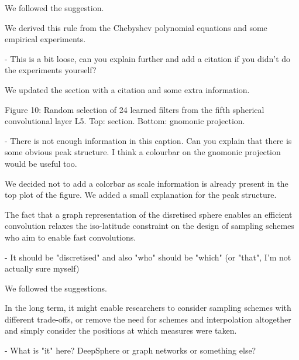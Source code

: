 \documentclass[12pt,a4paper]{article}
\newcommand{\nati}[1]{{\color[rgb]{.1,.6,.1}{NP: #1}}}
\newcommand{\TK}[1]{{\color{red}{TK: #1}}}
\newcommand{\todo}[1]{{\color[rgb]{.6,.1,.6}{TODO: #1}}}
\newcommand{\1}{\b{1}}              %
\newcommand{\0}{\b{0}}              %
\begin{document}
We followed the suggestion.

\begin{mdframed}[style=comment]
We derived this rule from the Chebyshev polynomial equations and some empirical experiments.

- This is a bit loose, can you explain further and add a citation if you didn't do the experiments yourself?
\end{mdframed}


We updated the section with a citation and some extra information.

\begin{mdframed}[style=comment]
Figure 10: Random selection of 24 learned filters from the fifth spherical convolutional layer L5. Top: section. Bottom: gnomonic projection.

- There is not enough information in this caption. Can you explain that there is some obvious peak structure. I think a colourbar on the gnomonic projection would be useful too.
\end{mdframed}


We decided not to add a colorbar as scale information is already present in the top plot of the figure.
We added a small explanation for the peak structure.

\begin{mdframed}[style=comment]
The fact that a graph representation of the disretised sphere enables an efficient convolution relaxes the iso-latitude constraint on the design of sampling schemes who aim to enable fast convolutions.

- It should be "discretised" and also "who" should be "which" (or "that", I'm not actually sure myself)
\end{mdframed}

We followed the suggestions.


\begin{mdframed}[style=comment]
In the long term, it might enable researchers to consider sampling schemes with different trade-offs, or remove the need for schemes and interpolation altogether and simply consider the positions at which measures were taken.

- What is "it" here? DeepSphere or graph networks or something else?
\end{mdframed}
\end{document}
